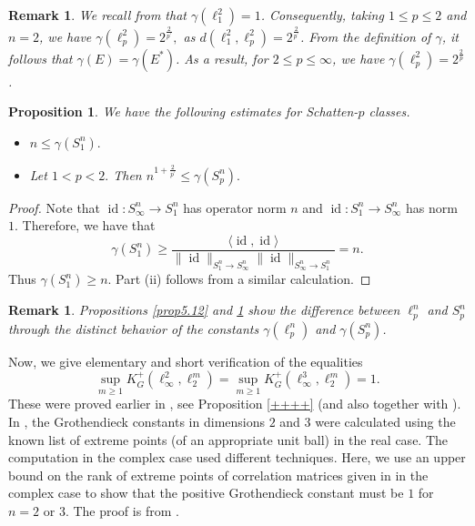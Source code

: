 \documentclass[a4paper,oneside,11pt, reqno]{amsart}
\numberwithin{equation}{section}
\newtheorem{proposition}[theorem]{Proposition}
\newtheorem{remark}[theorem]{Remark}
\theoremstyle{plain}
\begin{document}
\begin{remark} 
We recall from \cite{BM} that $\gamma(\ell_1^2) = 1$. Consequently, taking 
$1 \leqslant p \leqslant 2$ and $n=2$, we have $\gamma(\ell_p^2) = 2^{\tfrac{2}{p^\prime}},$ as $d(\ell_1^2,\ell_p^2)= 2^{\tfrac{2}{p^\prime}}$. From the definition of $\gamma$, it follows that 
$\gamma(E) = \gamma(E^*)$. As a result, for $2 \leqslant p \leqslant \infty$, we have $\gamma(\ell_p^2) = 2^{\tfrac{2}{p}}$.
\end{remark}
\begin{proposition}\label{prop5.13}
We have the following estimates for Schatten-$p$ classes.
\begin{itemize}
    \item[(i)] $n\leqslant \gamma(S_1^n).$
    \item[(ii)] Let $1<p<2.$ Then $n^{1+\frac{2}{p^\prime}}\leqslant \gamma(S_p^n).$
\end{itemize}
\end{proposition}

\begin{proof}
Note that $\operatorname{id}:S_\infty^n\to S_1^n$ has operator norm $n$ and $\operatorname{id}:S_1^n\to S_\infty^n$ has norm $1.$ Therefore, we have that
\[\gamma(S_1^n)\geqslant \frac{\langle \operatorname{id},\operatorname{id}\rangle }{\|\operatorname{id}\|_{S_{1}^n\to S_\infty^n}\|\operatorname{id}\|_{S_{\infty}^n\to S_{1}^n}}=n.\] Thus $\gamma(S_1^n)\geqslant {n}.$   Part (ii) follows from a similar calculation.
\end{proof}
\begin{remark}
Propositions  \ref{prop5.12} and \ref{prop5.13} show the difference between $\ell_p^n$ and $S_p^n$ through the distinct behavior of the constants $\gamma(\ell_p^n)$ and $\gamma(S_p^n)$.
\end{remark}
Now, we give elementary and short verification of the equalities  
\[\sup_{m\geqslant 1}K_G^{+}(\ell_\infty^2,\ell_2^m)=\sup_{m\geqslant 1}K_G^{+}(\ell_\infty^3,\ell_2^m)=1.\] 
These were proved earlier in \cite[Theorem 4.2]{AFHS95}, see Proposition \ref{++++} (and also  \cite[Fact 7]{BM} together with \cite[Fact 2]{BM}). 
 In \cite{BM08},  the Grothendieck constants in dimensions $2$ and $3$ were calculated using the known list of extreme points (of an appropriate unit ball) in the real case. The computation in the complex case used different techniques. Here, we use an upper bound on the rank of extreme points of correlation matrices given in \cite{LCB} in the complex case to show that the positive Grothendieck constant must be $1$ for $n=2$ or $3$. The proof is from \cite{RKS}. 
\end{document}

